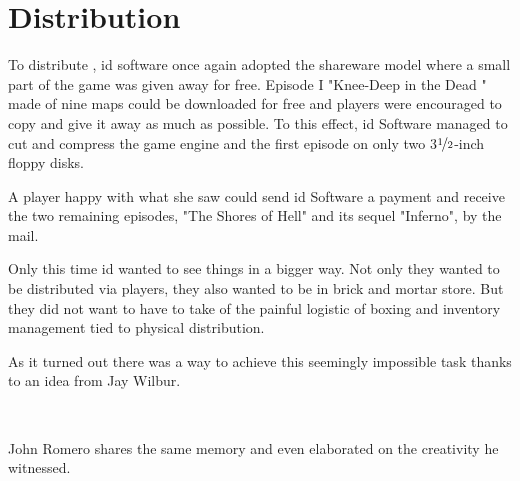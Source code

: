 \section{Distribution}
To distribute \doom, id software once again adopted the shareware model where a small part of the game was given away for free. Episode I "Knee-Deep in the Dead " made of nine maps could be downloaded for free and players were encouraged to copy and give it away as much as possible. To this effect, id Software managed to cut and compress the game engine and the first episode on only two 3$\nicefrac{1}{2}$-inch floppy disks.\\
\par 
A player happy with what she saw could send id Software a payment and receive the two remaining episodes, "The Shores of Hell" and its sequel "Inferno", by the mail.\\
\par
{}
\par
Only this time id wanted to see things in a bigger way. Not only they wanted to be distributed via players, they also wanted to be in brick and mortar store. But they did not want to have to take of the painful logistic of boxing and inventory management tied to physical distribution.\\
\par
 As it turned out there was a way to achieve this seemingly impossible task thanks to an idea from Jay Wilbur.\\
\par
{}\\
\par
John Romero shares the same memory and even elaborated on the creativity he witnessed.\\
